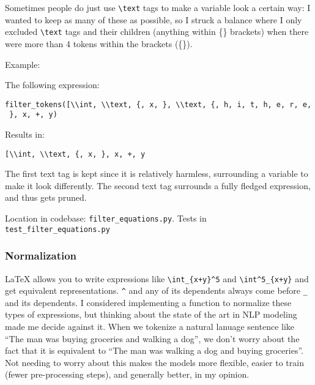 \documentclass[]{article}
\begin{document}
Sometimes people do just use \texttt{\textbackslash{}text} tags to make
a variable look a certain way: I wanted to keep as many of these as
possible, so I struck a balance where I only excluded
\texttt{\textbackslash{}text} tags and their children (anything within
\{\} brackets) when there were more than 4 tokens within the brackets
(\{\}).

Example:

The following expression:

\texttt{filter\_tokens({[}\textquotesingle{}\textbackslash{}\textbackslash{}int\textquotesingle{},\ \textquotesingle{}\textbackslash{}\textbackslash{}text\textquotesingle{},\ \textquotesingle{}\{\textquotesingle{},\ \textquotesingle{}x\textquotesingle{},\ \textquotesingle{}\}\textquotesingle{},\ \textquotesingle{}\textbackslash{}\textbackslash{}text\textquotesingle{},\ \textquotesingle{}\{\textquotesingle{},\ \textquotesingle{}h\textquotesingle{},\ \textquotesingle{}i\textquotesingle{},\ \textquotesingle{}t\textquotesingle{},\ \textquotesingle{}h\textquotesingle{},\ \textquotesingle{}e\textquotesingle{},\ \textquotesingle{}r\textquotesingle{},\ \textquotesingle{}e\textquotesingle{},\ \textquotesingle{}\}\textquotesingle{},\ \textquotesingle{}x\textquotesingle{},\ \textquotesingle{}+\textquotesingle{},\ \textquotesingle{}y\textquotesingle{}{]})}

Results in:

\texttt{{[}\textquotesingle{}\textbackslash{}\textbackslash{}int\textquotesingle{},\ \textquotesingle{}\textbackslash{}\textbackslash{}text\textquotesingle{},\ \textquotesingle{}\{\textquotesingle{},\ \textquotesingle{}x\textquotesingle{},\ \textquotesingle{}\}\textquotesingle{},\ \textquotesingle{}x\textquotesingle{},\ \textquotesingle{}+\textquotesingle{},\ \textquotesingle{}y\textquotesingle{}{]}}

The first text tag is kept since it is relatively harmless, surrounding
a variable to make it look differently. The second text tag surrounds a
fully fledged expression, and thus gets pruned.

Location in codebase: \texttt{filter\_equations.py}. Tests in
\texttt{test\_filter\_equations.py}

\hypertarget{normalization}{%
\subsubsection{Normalization}\label{normalization}}

LaTeX allows you to write expressions like
\texttt{\textbackslash{}int\_\{x+y\}\^{}5} and
\texttt{\textbackslash{}int\^{}5\_\{x+y\}} and get equivalent
representations. \texttt{\^{}} and any of its dependents always come
before \texttt{\_} and its dependents. I considered implementing a
function to normalize these types of expressions, but thinking about the
state of the art in NLP modeling made me decide against it. When we
tokenize a natural lanuage sentence like ``The man was buying groceries
and walking a dog'', we don't worry about the fact that it is equivalent
to ``The man was walking a dog and buying groceries''. Not needing to
worry about this makes the models more flexible, easier to train (fewer
pre-processing steps), and generally better, in my opinion.
\end{document}
